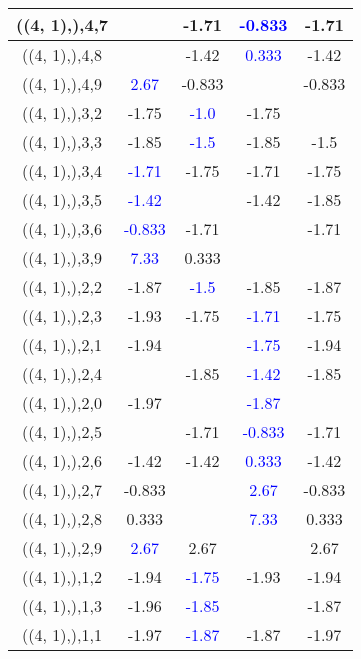 \documentclass{article}
\begin{document}
\begin{center}
\begin{longtable}{|c|c|c|c|c|}
        	\hline
        	((4, 1),),4,7&&-1.71& \textcolor{blue}{-0.833}&-1.71\\
        	\hline
        	((4, 1),),4,8&&-1.42& \textcolor{blue}{0.333}&-1.42\\
        	\hline
        	((4, 1),),4,9& \textcolor{blue}{2.67}&-0.833&&-0.833\\
        	\hline
        	((4, 1),),3,2&-1.75& \textcolor{blue}{-1.0}&-1.75&\\
        	\hline
        	((4, 1),),3,3&-1.85& \textcolor{blue}{-1.5}&-1.85&-1.5\\
        	\hline
        	((4, 1),),3,4& \textcolor{blue}{-1.71}&-1.75&-1.71&-1.75\\
        	\hline
        	((4, 1),),3,5& \textcolor{blue}{-1.42}&&-1.42&-1.85\\
        	\hline
        	((4, 1),),3,6& \textcolor{blue}{-0.833}&-1.71&&-1.71\\
        	\hline
        	((4, 1),),3,9& \textcolor{blue}{7.33}&0.333&&\\
        	\hline
        	((4, 1),),2,2&-1.87& \textcolor{blue}{-1.5}&-1.85&-1.87\\
        	\hline
        	((4, 1),),2,3&-1.93&-1.75& \textcolor{blue}{-1.71}&-1.75\\
        	\hline
        	((4, 1),),2,1&-1.94&& \textcolor{blue}{-1.75}&-1.94\\
        	\hline
        	((4, 1),),2,4&&-1.85& \textcolor{blue}{-1.42}&-1.85\\
        	\hline
        	((4, 1),),2,0&-1.97&& \textcolor{blue}{-1.87}&\\
        	\hline
        	((4, 1),),2,5&&-1.71& \textcolor{blue}{-0.833}&-1.71\\
        	\hline
        	((4, 1),),2,6&-1.42&-1.42& \textcolor{blue}{0.333}&-1.42\\
        	\hline
        	((4, 1),),2,7&-0.833&& \textcolor{blue}{2.67}&-0.833\\
        	\hline
        	((4, 1),),2,8&0.333&& \textcolor{blue}{7.33}&0.333\\
        	\hline
        	((4, 1),),2,9& \textcolor{blue}{2.67}&2.67&&2.67\\
        	\hline
        	((4, 1),),1,2&-1.94& \textcolor{blue}{-1.75}&-1.93&-1.94\\
        	\hline
        	((4, 1),),1,3&-1.96& \textcolor{blue}{-1.85}&&-1.87\\
        	\hline
        	((4, 1),),1,1&-1.97& \textcolor{blue}{-1.87}&-1.87&-1.97\\

\end{longtable}
\end{center}
\end{document}
